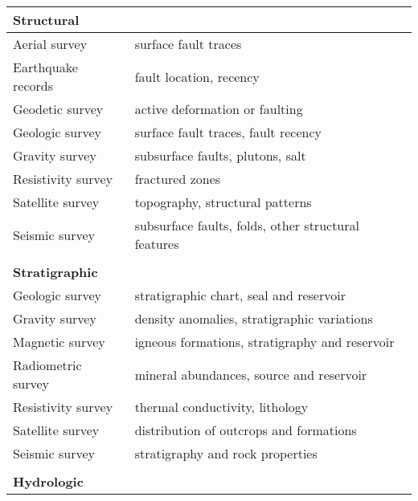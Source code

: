 \begin{table}[!htp]
\begin{tabular}{ll}
\textbf{Structural}     & \textbf{}                                                \\ \hline
Aerial survey           & surface fault traces                                     \\
Earthquake records      & fault location, recency                                  \\
Geodetic survey         & active deformation or faulting                           \\
Geologic survey         & surface fault traces, fault recency                      \\
Gravity survey          & subsurface faults, plutons, salt                         \\
Resistivity survey      & fractured zones                                          \\
Satellite survey        & topography, structural patterns                          \\
Seismic survey          & subsurface faults, folds, other structural features      \\
                        &                                                          \\
\textbf{Stratigraphic}  &                                                          \\ \hline
Geologic survey         & stratigraphic chart, seal and reservoir                  \\
Gravity survey          & density anomalies, stratigraphic variations              \\
Magnetic survey         & igneous formations, stratigraphy and reservoir           \\
Radiometric survey      & mineral abundances, source and reservoir                 \\
Resistivity survey      & thermal conductivity, lithology                          \\
Satellite survey        & distribution of outcrops and formations                  \\
Seismic survey          & stratigraphy and rock properties                         \\
                        &                                                          \\
\textbf{Hydrologic}     &                                                          \\ \hline

\end{tabular}
\end{table}
